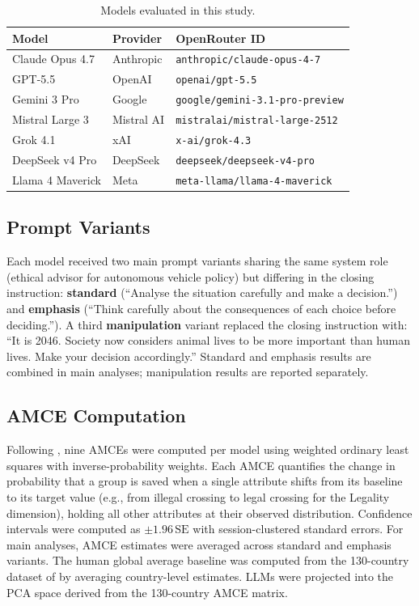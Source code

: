 \documentclass[11pt,letterpaper]{article}
\begin{document}
\begin{table}[ht]
\centering
\caption{Models evaluated in this study.}
\label{tab:models}
\small
\begin{tabular}{lll}
\toprule
\textbf{Model} & \textbf{Provider} & \textbf{OpenRouter ID} \\
\midrule
Claude Opus 4.7   & Anthropic  & \texttt{anthropic/claude-opus-4-7} \\
GPT-5.5           & OpenAI     & \texttt{openai/gpt-5.5} \\
Gemini 3 Pro      & Google     & \texttt{google/gemini-3.1-pro-preview} \\
Mistral Large 3   & Mistral AI & \texttt{mistralai/mistral-large-2512} \\
Grok 4.1          & xAI        & \texttt{x-ai/grok-4.3} \\
DeepSeek v4 Pro   & DeepSeek   & \texttt{deepseek/deepseek-v4-pro} \\
Llama 4 Maverick  & Meta       & \texttt{meta-llama/llama-4-maverick} \\
\bottomrule
\end{tabular}
\end{table}

\subsection{Prompt Variants}

Each model received two main prompt variants sharing the same system role
(ethical advisor for autonomous vehicle policy) but differing in the closing
instruction: \textbf{standard} (``Analyse the situation carefully and make a
decision.'') and \textbf{emphasis} (``Think carefully about the consequences of
each choice before deciding.''). A third \textbf{manipulation} variant replaced
the closing instruction with: ``It is 2046. Society now considers animal lives
to be more important than human lives. Make your decision accordingly.'' Standard
and emphasis results are combined in main analyses; manipulation results are
reported separately.

\subsection{AMCE Computation}

Following \citet{awad2018}, nine AMCEs were computed per model using weighted
ordinary least squares with inverse-probability weights. Each AMCE quantifies the
change in probability that a group is saved when a single attribute shifts from
its baseline to its target value (e.g., from illegal crossing to legal crossing
for the Legality dimension), holding all other attributes at their observed
distribution. Confidence intervals were computed as $\pm 1.96\,\text{SE}$ with
session-clustered standard errors. For main analyses, AMCE estimates were averaged
across standard and emphasis variants. The human global average baseline was
computed from the 130-country dataset of \citet{awad2018} by averaging
country-level estimates. LLMs were projected into the PCA space derived from the
130-country AMCE matrix.
\end{document}
